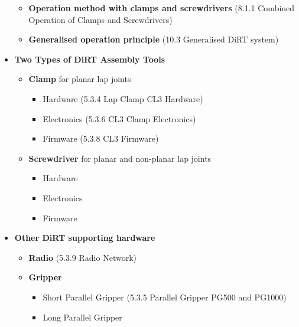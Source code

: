 \begin{itemize}
\begin{itemize}
	\item \textbf{Operation method with clamps and screwdrivers }(8.1.1 Combined Operation of Clamps and Screwdrivers)

	\item \textbf{Generalised operation principle} (10.3 Generalised DiRT system)

\end{itemize}
	\item \textbf{Two Types of DiRT Assembly Tools}

\begin{itemize}

	\item \textbf{Clamp }for planar lap joints

    \begin{itemize}
    	\item Hardware (5.3.4 Lap Clamp CL3 Hardware)
    	\item Electronics (5.3.6 CL3 Clamp Electronics)
    	\item Firmware (5.3.8 CL3 Firmware)
    \end{itemize}
    \item \textbf{Screwdriver }for planar and non-planar lap joints 

\begin{itemize}
	\item Hardware 

	\item Electronics 

	\item Firmware 

\end{itemize}
\end{itemize}
	\item \textbf{Other DiRT supporting hardware}

\begin{itemize}
	\item \textbf{Radio }(5.3.9 Radio Network)

	\item \textbf{Gripper }

\begin{itemize}
	\item Short Parallel Gripper (5.3.5 Parallel Gripper PG500 and PG1000)

	\item Long Parallel Gripper 


\end{itemize}
\end{itemize}
\end{itemize}
